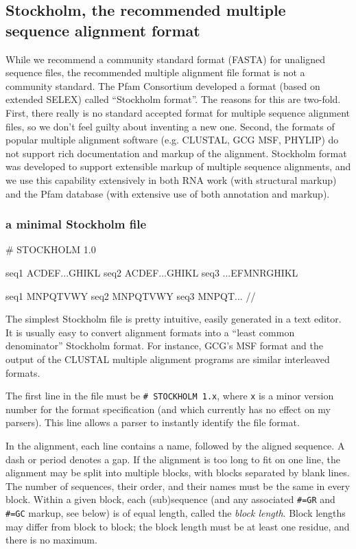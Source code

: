 \subsection{Stockholm, the recommended multiple sequence alignment format}

While we recommend a community standard format (FASTA) for unaligned
sequence files, the recommended multiple alignment file format is not
a community standard.  The Pfam Consortium developed a format (based
on extended SELEX) called ``Stockholm format''.  The reasons for this
are two-fold. First, there really is no standard accepted format for
multiple sequence alignment files, so we don't feel guilty about
inventing a new one. Second, the formats of popular multiple alignment
software (e.g. CLUSTAL, GCG MSF, PHYLIP) do not support rich
documentation and markup of the alignment.  Stockholm format was
developed to support extensible markup of multiple sequence
alignments, and we use this capability extensively in both RNA work
(with structural markup) and the Pfam database (with extensive use of
both annotation and markup).

\subsubsection{a minimal Stockholm file}
\begin{sreoutput}
# STOCKHOLM 1.0

seq1  ACDEF...GHIKL
seq2  ACDEF...GHIKL
seq3  ...EFMNRGHIKL

seq1  MNPQTVWY
seq2  MNPQTVWY
seq3  MNPQT...
//
\end{sreoutput}

The simplest Stockholm file is pretty intuitive, easily generated in a
text editor. It is usually easy to convert alignment formats into a
``least common denominator'' Stockholm format. For instance, GCG's MSF
format and the output of the CLUSTAL multiple alignment programs are
similar interleaved formats.

The first line in the file must be \verb+# STOCKHOLM 1.x+, where
\verb+x+ is a minor version number for the format specification
(and which currently has no effect on my parsers). This line allows a
parser to instantly identify the file format.

In the alignment, each line contains a name, followed by the aligned
sequence. A dash or period denotes a gap. If the alignment is too long
to fit on one line, the alignment may be split into multiple blocks,
with blocks separated by blank lines. The number of sequences, their
order, and their names must be the same in every block. Within a given
block, each (sub)sequence (and any associated \verb+#=GR+ and
\verb+#=GC+ markup, see below) is of equal length, called the
\textit{block length}. Block lengths may differ from block to block;
the block length must be at least one residue, and there is no
maximum.  

